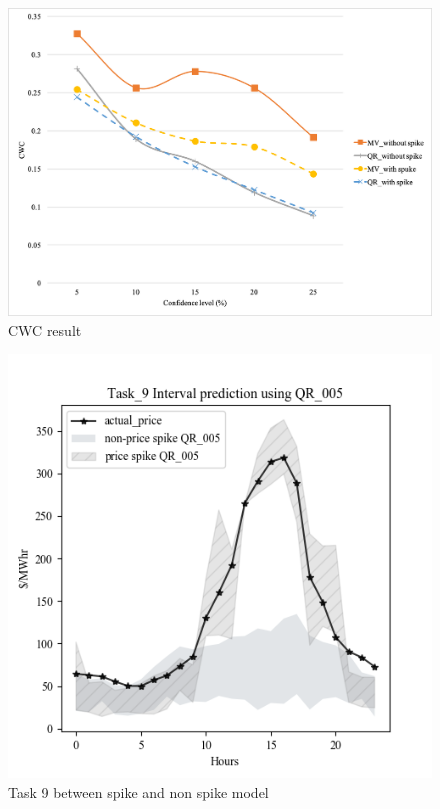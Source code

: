 \documentclass[review]{elsarticle}
\begin{document}
  \begin{figure}[H]
    \includegraphics[width=12cm]{CWC}
    \caption{CWC result}
    \label{Fig:CWC}
  \centering
  \end{figure}

  \begin{figure}[H]
    \includegraphics[width=12cm]{compare_between_non-spike_and_spike}
    \caption{Task 9 between spike and non spike model}
    \label{Fig:compare_spike_and_non_spike_model}
  \centering
  \end{figure}
\end{document}
